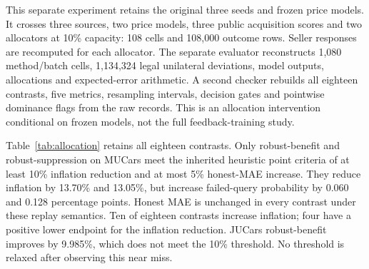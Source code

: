 \documentclass[11pt]{article}
\begin{document}
This separate experiment retains the original three seeds and frozen price
models. It crosses three sources, two price models, three public acquisition
scores and two allocators at 10\% capacity: 108 cells and 108,000 outcome rows.
Seller responses are recomputed for each allocator. The separate evaluator
reconstructs 1,080 method/batch cells, 1,134,324 legal unilateral deviations,
model outputs, allocations and expected-error arithmetic. A second checker
rebuilds all eighteen contrasts, five metrics, resampling intervals, decision
gates and pointwise dominance flags from the raw records. This is an allocation
intervention conditional on frozen models, not the full feedback-training study.

Table~\ref{tab:allocation} retains all eighteen contrasts. Only robust-benefit
and robust-suppression on MUCars meet the inherited heuristic point criteria of at
least 10\% inflation reduction and at most 5\% honest-MAE increase. They reduce
inflation by 13.70\% and 13.05\%, but increase failed-query probability by
0.060 and 0.128 percentage points. Honest MAE is unchanged in every contrast
under these replay semantics. Ten of eighteen contrasts increase inflation;
four have a positive lower endpoint for the inflation reduction. JUCars
robust-benefit improves by 9.985\%, which does not meet the 10\% threshold.
No threshold is relaxed after observing this near miss.
\end{document}
